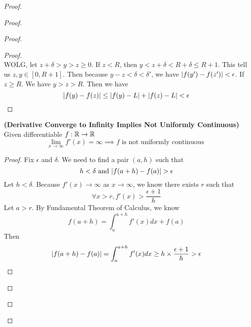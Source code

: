 \documentclass{report}
\begin{document}
\begin{proof}
\begin{proof}
\begin{proof}
\begin{proof}
\begin{equation*}
\end{equation*}
WOLG, let $z+\delta>y>z\geq 0$. If $z<R$, then  $y<z+\delta<R+\delta\leq R+1$. This tell us $z,y\in [0,R+1]$. Then because $y-z<\delta<\delta'$, we have $|f(y')-f(z')|<\epsilon $. If $z\geq R$. We have $y>z>R$. Then we have 
 \begin{equation*}
|f(y)-f(z)|\leq |f(y)-L|+|f(z)-L|<\epsilon 
\end{equation*}
\end{proof}
\begin{theorem}
\label{5.4.4}
\textbf{(Derivative Converge to Infinity Implies Not Uniformly Continuous)} Given differentiable $f:\mathbb{R}\rightarrow \mathbb{R}$
\begin{equation*}
\lim_{x\to \infty}f'(x)=\infty \implies f\text{ is not uniformly continuous }
\end{equation*}
\end{theorem}
\begin{proof}
Fix $\epsilon $ and $\delta$. We need to find a pair $(a,h)$ such that  
\begin{equation*}
h<\delta \text{ and }\abso{f(a+h)-f(a)}>\epsilon 
\end{equation*}
Let $h<\delta$. Because  $f'(x)\to \infty$ as $x \to \infty$, we know there exists $r$ such that 
 \begin{equation*}
\forall x>r, f'(x)>\frac{\epsilon +1}{h}
\end{equation*}
Let $a>r$. By Fundamental Theorem of Calculus, we know 
 \begin{equation*}
f(a+h)=\int_a^{a+h}f'(x)dx + f(a)
\end{equation*}
Then 
\begin{equation*}
|f(a+h)-f(a)|=\int_a^{a+h}f'(x)dx\geq h\times \frac{\epsilon +1}{h}>\epsilon 
\end{equation*}

\end{proof}


\end{proof}
\end{proof}
\end{proof}
\end{document}
